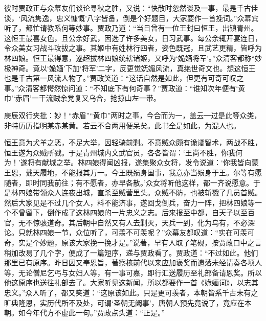 \begin{parag}
    彼时贾政正与众幕友们谈论寻秋之胜，又说：“快散时忽然谈及一事，最是千古佳谈，‘风流隽逸，忠义慷慨’八字皆备，倒是个好题目，大家要作一首挽词。”众幕宾听了，都忙请教系何等妙事。贾政乃道：“当日曾有一位王封曰恒王，出镇青州。这恒王最喜女色，且公余好武，因选了许多美女，日习武事。每公余辄开宴连日，令众美女习战斗攻拔之事。其姬中有姓林行四者，姿色既冠，且武艺更精，皆呼为林四娘。恒王最得意，遂超拔林四娘统辖诸姬，又呼为‘姽婳将军’。”众清客都称“妙极神奇。竟以‘姽婳’下加‘将军’二字，反更觉妩媚风流，真绝世奇文也。想这恒王也是千古第一风流人物了。”贾政笑道：“这话自然是如此，但更有可奇可叹之事。”众清客都愕然惊问道：“不知底下有何奇事？”贾政道：“谁知次年便有‘黄巾’‘赤眉’一干流贼余党复又乌合，抢掠山左一带。\begin{note}庚辰双行夹批：妙！“赤眉”“黄巾”两时之事，今合而为一，盖云一过是此等众类，非特历历指明某赤某黄。若云不合两用便呆矣。此书全是如此，为混人也。\end{note}恒王意为犬羊之恶，不足大举，因轻骑前剿。不意贼众颇有诡谲智术，两战不胜，恒王遂为众贼所戮。于是青州城内文武官员，各各皆谓：‘王尚不胜，你我何为！’遂将有献城之举。林四娘得闻凶报，遂集聚众女将，发令说道：‘你我皆向蒙王恩，戴天履地，不能报其万一。今王既殒身国事，我意亦当殒身于王。尔等有愿随者，即时同我前往；有不愿者，亦早各散。’众女将听他这样，都一齐说愿意。于是林四娘带领众人连夜出城，直杀至贼营里头。众贼不防，也被斩戮了几员首贼。然后大家见是不过几个女人，料不能济事，遂回戈倒兵，奋力一阵，把林四娘等一个不曾留下，倒作成了这林四娘的一片忠义之志。后来报至中都，自天子以至百官，无不惊骇道奇。其后朝中自然又有人去剿灭，天兵一到，化为乌有，不必深论。只就林四娘一节，众位听了，可羡不可羡呢？”众幕友都叹道：“实在可羡可奇，实是个妙题，原该大家挽一挽才是。”说著，早有人取了笔砚，按贾政口中之言稍加改易了几个字，便成了一篇短序，递与贾政看了。贾政道：“不过如此。他们那里已有原序。昨日因又奉恩旨，著察核前代以来应加褒奖而遗落未经请奏各项人等，无论僧尼乞丐与女妇人等，有一事可嘉，即行汇送履历至礼部备请恩奖。所以他这原序也送往礼部去了。大家听见这新闻，所以都要作一首《姽婳词》，以志其忠义。”众人听了，都又笑道：“这原该如此。只是更可羡者，本朝皆系千古未有之旷典隆恩，实历代所不及处，可谓‘圣朝无阙事’，唐朝人预先竟说了，竟应在本朝。如今年代方不虚此一句。”贾政点头道：“正是。”
\end{parag}


